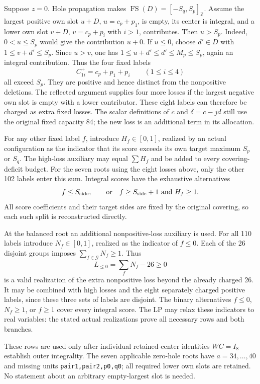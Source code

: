 \documentclass[11pt,a4paper]{article}
\theoremstyle{remark}
\newcommand{\FS}{\operatorname{FS}}
\newcommand{\Z}{\mathbb Z}
\begin{document}
Suppose $z=0$. Hole propagation makes $\FS(D)=[-S_q,S_p]_{\Z}$.
Assume the largest positive own slot $u+D$, $u=c_p+p_1$, is empty,
its center is integral, and a lower own slot $v+D$, $v=c_p+p_i$ with
$i>1$, contributes. Then $u>S_p$. Indeed, $0<u\le S_p$ would give
the contribution $u+0$. If $u\le0$, choose $d'\in D$ with
$1\le v+d'\le S_p$. Since $u>v$, one has
$1\le u+d'\le d'\le M_p\le S_p$, again an integral contribution.
Thus the four fixed labels
\[
 C^+_{1i}=c_p+p_1+p_i\qquad(1\le i\le4)
\]
all exceed $S_p$. They are positive and hence distinct from the
nonpositive deletions. The reflected argument supplies four more losses
if the largest negative own slot is empty with a lower contributor.
These eight labels can therefore be charged as extra fixed losses.
The scalar definitions of $c$ and $\delta=c-jd$ still use the original
fixed capacity 84; the new loss is an additional term in its allocation.

For any other fixed label $f$, introduce $H_f\in[0,1]$, realized by an
actual configuration as the indicator that its score exceeds its own
target maximum $S_p$ or $S_q$. The high-loss auxiliary may equal
$\sum H_f$ and be added to every covering-deficit budget. For the seven
roots using the eight losses above, only the other 102 labels enter this
sum. Integral scores have the exhaustive alternatives
\[
 f\le S_{\rm side},\qquad
 \hbox{or}\quad f\ge S_{\rm side}+1\ \hbox{and}\ H_f\ge1.
\]
All score coefficients and their target sides are fixed by the original
covering, so each such split is reconstructed directly.

At the balanced root an additional nonpositive-loss auxiliary is used.
For all 110 labels introduce $N_f\in[0,1]$, realized as the indicator
of $f\le0$. Each of the 26 disjoint groups imposes
$\sum_{f\in\mathcal G}N_f\ge1$. Thus
\[
 L_{\le0}=\sum_fN_f-26\ge0
\]
is a valid realization of the extra nonpositive loss beyond the already
charged 26. It may be combined with high losses and the eight separately
charged positive labels, since these three sets of labels are disjoint.
The binary alternatives $f\le0$, $N_f\ge1$, or $f\ge1$ cover every
integral score. The LP may relax these indicators to real variables:
the stated actual realizations prove all necessary rows and both branches.

These rows are used only after individual retained-center identities
$WC=I_8$ establish outer integrality. The seven applicable zero-hole
roots have $a=34,\ldots,40$ and missing units
\texttt{pair1,pair2,p0,q0}; all required lower own slots are retained.
No statement about an arbitrary empty-largest slot is needed.
\end{document}
